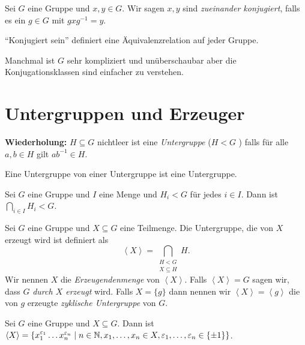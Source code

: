 \begin{definition}
	Sei $G$ eine Gruppe und $x,y \in G$.
	Wir sagen $x,y$ sind \emph{zueinander konjugiert}, falls es ein $g \in G$ mit $g x g^{-1} = y$.
\end{definition}

\begin{lemma}
	\enquote{Konjugiert sein} definiert eine Äquivalenzrelation auf jeder Gruppe.
\end{lemma}



Manchmal ist $G$ sehr kompliziert und unüberschaubar aber die Konjugationsklassen sind einfacher zu verstehen.



\section{Untergruppen und Erzeuger}
\textbf{Wiederholung:}
$H\subseteq G$ nichtleer ist eine \emph{Untergruppe} ($H<G$ ) falls für alle $a,b \in H$ gilt $ab^{-1} \in H$.



\begin{lemma}
	Eine Untergruppe von einer Untergruppe ist eine Untergruppe.
\end{lemma}

\begin{lemma}
	Sei $G$ eine Gruppe und $I$ eine Menge und $H_{i} < G$ für jedes $i \in I$.
	Dann ist $\bigcap_{i \in I} H_{i} < G$.
\end{lemma}

\begin{definition}
	Sei $G$ eine Gruppe und $X \subseteq G$ eine Teilmenge. Die Untergruppe, die von $X$ erzeugt wird ist definiert als
	\[
		\left< X \right> = \bigcap_{\substack{H < G\\ X \subseteq H}} H
	.\] 
	Wir nennen $X$ die \emph{Erzeugendenmenge} von $\left< X \right>$. Falls $\left< X \right> = G$ sagen wir, dass $G$ \emph{durch $X$ erzeugt} wird.
	Falls $X = \{g\}$ dann nennen wir $\left< X \right> = \left< g \right>$ die von $g$ erzeugte \emph{zyklische Untergruppe} von $G$. 
\end{definition}

\begin{lemma}
	Sei $G$ eine Gruppe und $X \subseteq G$. Dann ist $\left< X \right> = 
	\{x_{1}^{\varepsilon_1}\ldots x_{n}^{\varepsilon_{n}} \mid n \in \mathbb{N}, x_1,\ldots,x_{n} \in X, \varepsilon_1,\ldots,\varepsilon_{n} \in \{\pm 1\} \} $.
\end{lemma}


